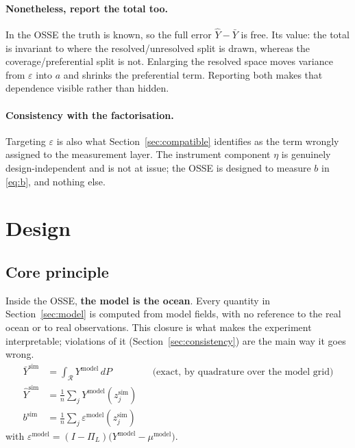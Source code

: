\documentclass[11pt]{article}
\begin{document}
\paragraph{Nonetheless, report the total too.} In the OSSE the truth is known, so the full
error $\hat{Y} - \bar{Y}$ is free. Its value: the total is invariant to where the
resolved/unresolved split is drawn, whereas the coverage/preferential split is not. Enlarging
the resolved space moves variance from $\varepsilon$ into $a$ and shrinks the preferential
term. Reporting both makes that dependence visible rather than hidden.

\paragraph{Consistency with the factorisation.} Targeting $\varepsilon$ is also what
Section~\ref{sec:compatible} identifies as the term wrongly assigned to the measurement layer.
The instrument component $\eta$ is genuinely design-independent and is not at issue; the OSSE
is designed to measure $b$ in \eqref{eq:b}, and nothing else.

\section{Design}

\subsection{Core principle}

Inside the OSSE, \textbf{the model is the ocean}. Every quantity in
Section~\ref{sec:model} is computed from model fields, with no reference to the real ocean or
to real observations. This closure is what makes the experiment interpretable; violations of it
(Section~\ref{sec:consistency}) are the main way it goes wrong.
\begin{align}
  \bar{Y}^{\text{sim}} &= \int_{\mathcal{R}} Y^{\text{model}} \, dP
    &&\text{(exact, by quadrature over the model grid)} \\
  \hat{Y}^{\text{sim}} &= \frac{1}{n}\sum_j Y^{\text{model}}(z_j^{\text{sim}}) && \\
  b^{\text{sim}} &= \frac{1}{n}\sum_j \varepsilon^{\text{model}}(z_j^{\text{sim}}) &&
\end{align}
with $\varepsilon^{\text{model}} = (I - \Pi_L)\big(Y^{\text{model}} - \mu^{\text{model}}\big)$.
\end{document}
